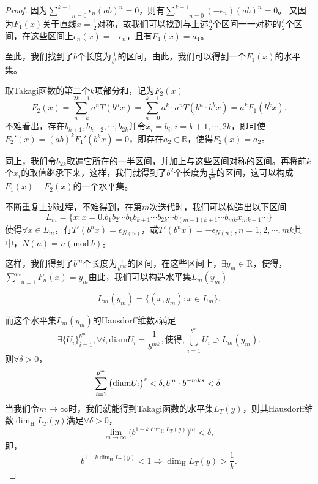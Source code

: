 \begin{proof}
    因为$\underset{n=0}{\overset{k-1}{\sum}}\epsilon_n(ab)^n=0$，则有$\underset{n=0}{\overset{k-1}{\sum}}(-\epsilon_n)(ab)^n=0$。
    又因为$F_1(x)$关于直线$x=\frac{1}{2}$对称，故我们可以找到与上述$\frac{b}{2}$个区间一一对称的$\frac{b}{2}$个区间，在这些区间上$\epsilon_n(x)=-\epsilon_n$，且有$F_1(x)=a_1$。

    至此，我们找到了$b$个长度为$\frac{1}{b^k}$的区间，由此，我们可以得到一个$F_1(x)$的水平集。

    取Takagi函数的第二个$k$项部分和，记为$F_2(x)$
    $$
        F_2(x)=\sum_{n=k}^{2k-1}a^nT(b^nx)=\sum_{n=0}^{k-1}a^k\cdot a^nT(b^n\cdot b^kx)=a^kF_1(b^kx).
    $$
    不难看出，存在$b_{k+1},b_{k+2},\cdots,b_{2k}$并令$x_i=b_i,i=k+1,\cdots,2k$，即可使$F_2'(x)=(ab)^kF_1'(b^kx)=0$，即存在$a_2\in\mathbb{R}$，使得$F_2(x)=a_2$。

    同上，我们令$b_{2k}$取遍它所在的一半区间，并加上与这些区间对称的区间。再将前$k$个$x_i$的取值继承下来，这样，我们就得到了$b^2$个长度为$\frac{1}{b^{2k}}$的区间，这可以构成$F_1(x)+F_2(x)$的一个水平集。

    不断重复上述过程，不难得到，在第$m$次迭代时，我们可以构造出以下区间
    $$
        L_m=\{x:x=0.b_1b_2\cdots b_kb_{k+1}\cdots b_{2k}\cdots b_{(m-1)k+1}\cdots b_{mk}x_{mk+1}\cdots\}
    $$
    使得$\forall x\in L_m$，有$T'(b^nx)=\epsilon_{N(n)}$，或$T'(b^nx)=-\epsilon_{N(n)},n=1,2,\cdots,mk$其中，$N(n)=n(\mathrm{mod}~b)$。

    这样，我们得到了$b^m$个长度为$\frac{1}{b^{mk}}$的区间，在这些区间上，$\exists y_m\in\mathrm{R}$，使得，$\underset{n=1}{\overset{m}{\sum}}F_n(x)=y_m$由此，我们可以构造水平集$L_m(y_m)$

    $$
        L_m(y_m)=\{(x,y_m):x\in L_m\}.
    $$

    而这个水平集$L_m(y_m)$的Hausdorff维数$s$满足
    $$
        \exists \{U_i\}_{i=1}^{b^m},\forall i,\mathrm{diam}U_i=\frac{1}{b^{mk}},\mbox{使得},\bigcup_{i=1}^{b^m}U_i\supset L_m(y_m).
    $$
    则$\forall \delta>0$，
    $$
        \sum_{i=1}^{b^m}\big(\mathrm{diam}U_i\big)^s<\delta,\\
        b^{m}\cdot b^{-mks}<\delta.
    $$
    当我们令$m\rightarrow\infty$时，我们就能得到Takagi函数的水平集$L_T(y)$，则其Hausdorff维数$\mathrm{\dim_H}L_T(y)$满足$\forall\delta>0$，
    $$
        \lim\limits_{m\rightarrow\infty}\big(b^{1-k\mathrm{\dim_H}L_T(y)}\big)^{m}<\delta,
    $$
    即，
    $$
        b^{1-k\mathrm{\dim_H}L_T(y)}<1\Rightarrow \mathrm{\dim_H}L_T(y)>\frac{1}{k}.
    $$

\end{proof}

